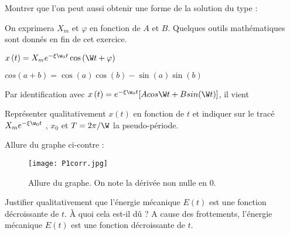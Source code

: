 \documentclass[a4paper, 10pt, garamond]{book}
\begin{document}
\QR
{Montrer que l’on peut aussi obtenir une forme de la solution du type :

                                                                   
\noindent                                                                  
On exprimera $X_m$ et $\varphi$ en fonction de $A$ et $B$. Quelques outils mathématiques sont donnés en fin de cet exercice. }
{
 {$x\left(t\right)=X_me^{-\xi\w_0t}\cos{(}\W t+\varphi)$}

 {$cos\left(a+b\right)=\cos{\left(a\right)}\cos{\left(b\right)}-\sin{\left(a\right)}\sin(b)$}



Par identification avec $x\left(t\right)=e^{-\xi\w_0t}[Acos\W t+Bsin(\W t)]$, il vient		 


	


}

\QR
{Représenter qualitativement $x\left(t\right)$ en fonction de $t$ et indiquer sur le tracé $X_m e^{-\xi\w_0t}$ , $x_0$ et $T={2\pi}/{\W}$ la pseudo-période.}
{
Allure du graphe ci-contre : 

\begin{figure}[htbp!]
  \centering
  \texttt{[image: P1corr.jpg]}
  \caption{Allure du graphe. On note la dérivée non nulle en 0.}
  \label{fig:P1corr}
\end{figure}

}

\QR
{Justifier qualitativement que l’énergie mécanique $E(t)$ est une fonction décroissante de $t$. À quoi cela est-il dû ?}
{
A cause des frottements, l’énergie mécanique $E(t)$ est une fonction décroissante de $t$.
}
\end{document}
